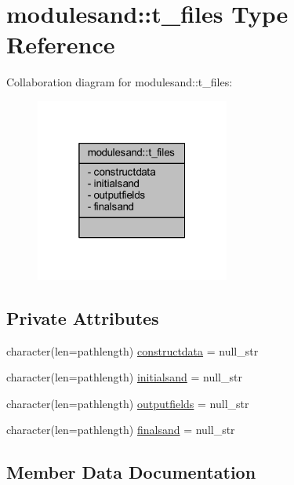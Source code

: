 \hypertarget{structmodulesand_1_1t__files}{}\section{modulesand\+:\+:t\+\_\+files Type Reference}
\label{structmodulesand_1_1t__files}


Collaboration diagram for modulesand\+:\+:t\+\_\+files\+:\nopagebreak
\begin{figure}[H]
\begin{center}
\leavevmode
\includegraphics[width=181pt]{structmodulesand_1_1t__files__coll__graph}
\end{center}
\end{figure}
\subsection*{Private Attributes}
\begin{DoxyCompactItemize}
\item 
character(len=pathlength) \mbox{\hyperlink{structmodulesand_1_1t__files_a562a958de9d839420c9af5d889eec4e6}{constructdata}} = null\+\_\+str
\item 
character(len=pathlength) \mbox{\hyperlink{structmodulesand_1_1t__files_aecbc7380570ce33bfd8e84ab6b8d240b}{initialsand}} = null\+\_\+str
\item 
character(len=pathlength) \mbox{\hyperlink{structmodulesand_1_1t__files_ab8584b56632f78a3c879814e2757816f}{outputfields}} = null\+\_\+str
\item 
character(len=pathlength) \mbox{\hyperlink{structmodulesand_1_1t__files_a32dc1ab7a0679ad7108bb715411e11f3}{finalsand}} = null\+\_\+str
\end{DoxyCompactItemize}


\subsection{Member Data Documentation}
\mbox{\label{structmodulesand_1_1t__files_a562a958de9d839420c9af5d889eec4e6}} 
